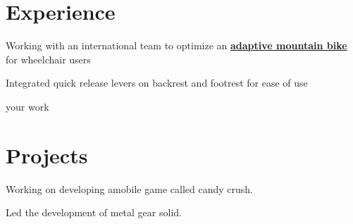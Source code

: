 \documentclass[]{deedy-resume-openfont}
\begin{document}
\begin{minipage}[t]{0.66\textwidth} 


\section{Experience}
\vspace{\topsep}
\begin{tightemize}
\item Working with an international team to optimize an \textbf{\href{link}{adaptive mountain bike}} for wheelchair users
\item Integrated quick release levers on backrest and footrest for ease of use
\end{tightemize}

\sectionsep


\begin{tightemize}
\item your work
\end{tightemize}
\sectionsep


\section{Projects}

Working on developing amobile game called candy crush.
\sectionsep

Led the development of metal gear solid.
\sectionsep







\end{minipage} 
\end{document}
